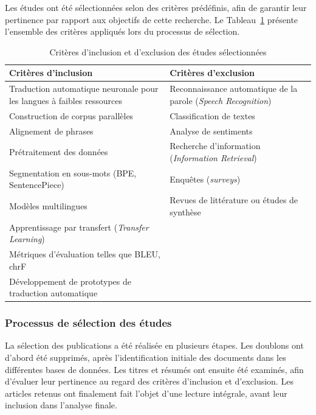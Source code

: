 Les études ont été sélectionnées selon des critères prédéfinis, afin de garantir leur pertinence par rapport aux objectifs de cette recherche. Le Tableau~\ref{tab:criteres_selection} présente l'ensemble des critères appliqués lors du processus de sélection.

\begin{table}[H]
\centering
\renewcommand{\arraystretch}{1.5}
\begin{tabular}{p{6.8cm}p{6.8cm}}
\toprule
\textbf{Critères d'inclusion} & \textbf{Critères d'exclusion} \\
\midrule
Traduction automatique neuronale pour les langues à faibles ressources & Reconnaissance automatique de la parole (\textit{Speech Recognition}) \\
Construction de corpus parallèles & Classification de textes \\
Alignement de phrases & Analyse de sentiments \\
Prétraitement des données & Recherche d'information (\textit{Information Retrieval}) \\
Segmentation en sous-mots (\ac{BPE}, \ac{SentencePiece}) & Enquêtes (\textit{surveys}) \\
Modèles multilingues & Revues de littérature ou études de synthèse \\
Apprentissage par transfert (\textit{Transfer Learning}) & \\
Métriques d'évaluation telles que \ac{BLEU}, \ac{chrF} & \\
Développement de prototypes de traduction automatique & \\
\bottomrule
\end{tabular}
\caption{Critères d'inclusion et d'exclusion des études sélectionnées}
\label{tab:criteres_selection}
\end{table}

\subsubsection{Processus de sélection des études}

La sélection des publications a été réalisée en plusieurs étapes. Les doublons ont d'abord été supprimés, après l'identification initiale des documents dans les différentes bases de données. Les titres et résumés ont ensuite été examinés, afin d'évaluer leur pertinence au regard des critères d'inclusion et d'exclusion. Les articles retenus ont finalement fait l'objet d'une lecture intégrale, avant leur inclusion dans l'analyse finale.

